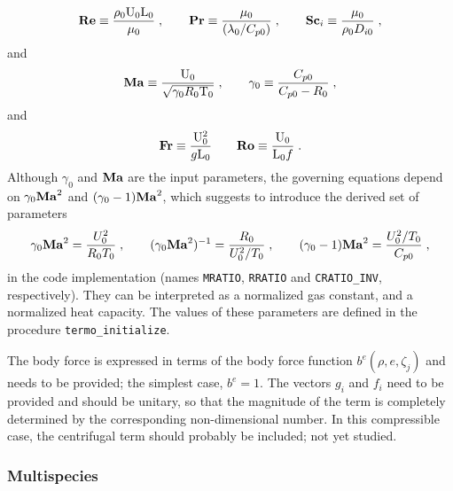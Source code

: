 \begin{equation}
    \mathrm{\bf Re} \equiv \frac{\rho_0 \mathrm{U}_0 \mathrm{L}_0}{\mu_0}\;, \qquad
    \mathrm{\bf Pr} \equiv \frac{\mu_0}{(\lambda_0/C_{p0})}\;, \qquad
    \mathrm{\bf Sc}_i \equiv \frac{\mu_0}{\rho_0 D_{i0}}\;,
\end{equation}
and
\begin{equation}
    \mathrm{\bf Ma}  \equiv \frac{\mathrm{U}_0}{\sqrt{\gamma_0 R_0 \mathrm{T}_0}}\;, \qquad
    \gamma_0 \equiv \frac{C_{p0}}{C_{p0}-R_0}\;,
\end{equation}
and
\begin{equation}
    \mathrm{\bf Fr} \equiv \frac{\mathrm{U}_0^2}{g\mathrm{L}_0} \qquad \mathrm{\bf Ro} \equiv \frac{\mathrm{U}_0}{\mathrm{L}_0f} \;.
\end{equation}
Although $\gamma_0$ and $\mathrm{\bf Ma}$ are the input parameters, the governing equations depend on $\gamma_0\mathrm{\bf Ma}^2$ and $(\gamma_0-1)\mathrm{\bf Ma}^2$, which suggests to introduce the derived set of parameters
\begin{equation}
    \gamma_0\mathrm{\bf Ma}^2=\frac{U_0^2}{R_0T_0}\;,\qquad (\gamma_0\mathrm{\bf Ma}^2)^{-1}=\frac{R_0}{U^2_0/T_0}\;,\qquad (\gamma_0-1)\mathrm{\bf Ma}^2 =\frac{U_0^2/T_0}{C_{p0}} \;,
\end{equation}
in the code implementation (names \texttt{MRATIO}, \texttt{RRATIO} and \texttt{CRATIO\_INV}, respectively). They can be interpreted as a normalized gas constant, and a normalized heat capacity. The values of these parameters are defined in the procedure \texttt{termo\_initialize}.

The body force is expressed in terms of the body force function $b^e(\rho,e,\zeta_j)$ and needs to be provided; the simplest case, $b^e=1$. The vectors $g_i$ and $f_i$ need to be provided and should be unitary, so that the magnitude of the term is completely determined by the corresponding non-dimensional number. In this compressible case, the centrifugal term should probably be included; not yet studied.

\subsubsection{Multispecies}

